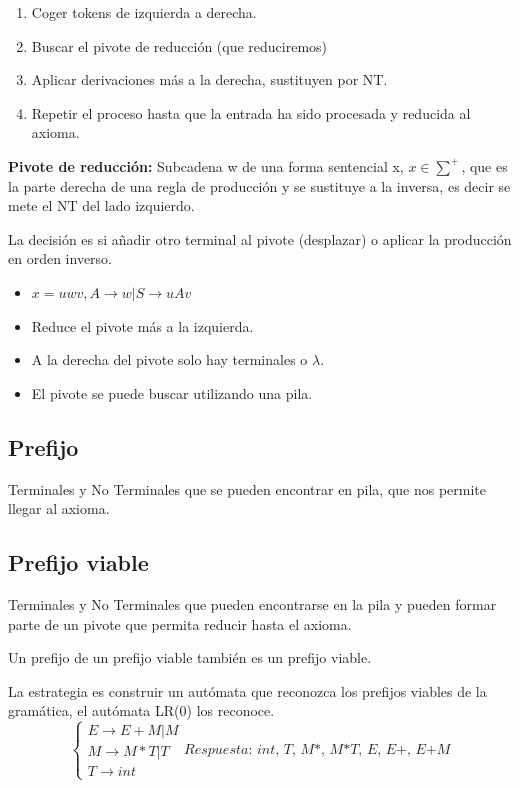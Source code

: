 \documentclass[12pt, twoside, openright]{report} %
\begin{document}
\begin{enumerate}
  \item Coger tokens de izquierda a derecha.
  \item Buscar el pivote de reducción (que reduciremos)
  \item Aplicar derivaciones más a la derecha, sustituyen por NT.
  \item Repetir el proceso hasta que la entrada ha sido procesada y reducida al axioma.
\end{enumerate}

\textbf{Pivote de reducción:} Subcadena w de una forma sentencial x, $x \in \sum^+$, que es la parte derecha de una regla de producción y se sustituye a la inversa, es decir se mete el NT del lado izquierdo. 

La decisión es si añadir otro terminal al pivote (desplazar) o aplicar la producción en orden inverso.
\begin{itemize}
  \item $x=uwv, A \rightarrow w | S \rightarrow uAv$
  \item Reduce el pivote más a la izquierda.
  \item A la derecha del pivote solo hay terminales o $\lambda$.
  \item El pivote se puede buscar utilizando una pila.
\end{itemize}

\subsection{Prefijo} 
Terminales y No Terminales que se pueden encontrar en pila, que nos permite llegar al axioma.

\subsection{Prefijo viable} 
Terminales y No Terminales que pueden encontrarse en la pila y pueden formar parte de un pivote que permita reducir hasta el axioma. 

Un prefijo de un prefijo viable también es un prefijo viable.

La estrategia es construir un autómata que reconozca los prefijos viables de la gramática, el autómata LR(0) los reconoce.
\vspace{-10px}
$$\begin{cases}
E \rightarrow E+M | M\\
M \rightarrow M*T | T\\
T \rightarrow \textit{int}
\end{cases}
\textit{Respuesta: int, T, M*, M*T, E, E+, E+M}$$
  
\end{document}
